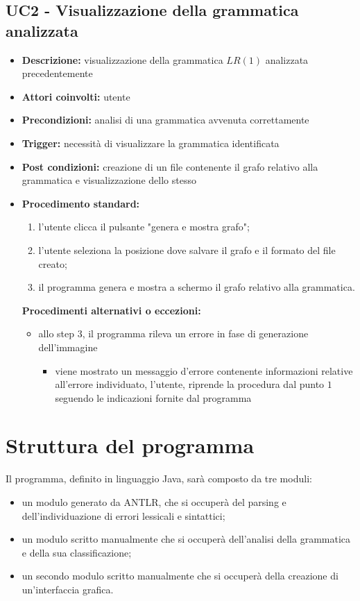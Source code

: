 \documentclass[12pt]{article}
\begin{document}
\subsection{UC2 - Visualizzazione della grammatica analizzata}
\begin{itemize}[label=]
\item \textbf{Descrizione:} visualizzazione della grammatica $LR\left( 1 \right)$ analizzata precedentemente
\item \textbf{Attori coinvolti:} utente
\item \textbf{Precondizioni:} analisi di una grammatica avvenuta correttamente
\item \textbf{Trigger:} necessità di visualizzare la grammatica identificata
\item \textbf{Post condizioni:} creazione di un file contenente il grafo relativo alla grammatica e visualizzazione dello stesso
\item \textbf{Procedimento standard:}
\begin{enumerate}[label=\arabic*.]
\item l'utente clicca il pulsante "genera e mostra grafo";
\item l'utente seleziona la posizione dove salvare il grafo e il formato del file creato;
\item il programma genera e mostra a schermo il grafo relativo alla grammatica.
\end{enumerate}
\textbf{Procedimenti alternativi o eccezioni:}
\begin{itemize}
\item allo step $3$, il programma rileva un errore in fase di generazione dell'immagine
\begin{itemize}[label=]
\item viene mostrato un messaggio d'errore contenente informazioni relative all'errore individuato, l'utente, riprende la procedura dal punto $1$ seguendo le indicazioni fornite dal programma
\end{itemize}
\end{itemize}
\end{itemize}
\pagebreak
\section{Struttura del programma}
Il programma, definito in linguaggio Java, sarà composto da tre moduli:
\begin{itemize}
\item un modulo generato da ANTLR, che si occuperà del parsing e dell'individuazione di errori lessicali e sintattici;
\item un modulo scritto manualmente che si occuperà dell'analisi della grammatica e della sua classificazione;
\item un secondo modulo scritto manualmente che si occuperà della creazione di un'interfaccia grafica.
\end{itemize}
\pagebreak
\end{document}
